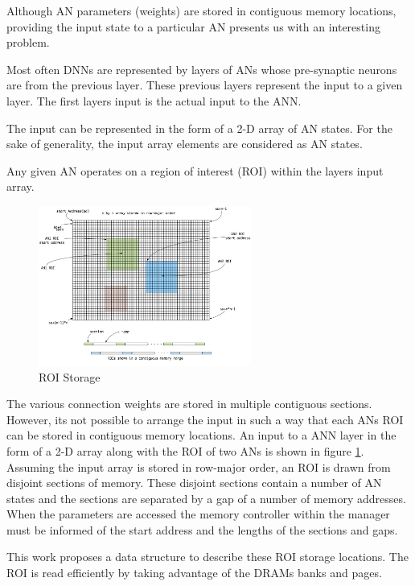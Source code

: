 \documentclass[journal]{IEEEtran}
\begin{document}
Although AN parameters (weights) are stored in contiguous memory locations, providing the input state to a particular AN presents us with an interesting problem.

Most often DNNs are represented by layers of ANs whose pre-synaptic neurons are from the previous layer. These previous layers represent the input to a given layer. The first layers input is the actual input to the ANN.

The input can be represented in the form of a 2-D array of AN states. For the sake of generality, the input array elements are considered as AN states.

Any given AN operates on a region of interest (ROI) within the layers input array.


\begin{figure}[!t]
\centerline{
\mbox{\includegraphics[width=2.75in]{roiStorage.jpg}}
}
\caption{ROI Storage}
\label{fig:roiStorage}
\end{figure}

The various connection weights are stored in multiple contiguous sections. However, its not possible to arrange the input in such a way that each ANs ROI can be stored in contiguous memory locations. 
An input to a ANN layer in the form of a 2-D array along with the ROI of two ANs is shown in figure \ref{fig:roiStorage}. 
Assuming the input array is stored in row-major order, an ROI is drawn from disjoint sections of memory. 
These disjoint sections contain a number of AN states and the sections are separated by a gap of a number of memory addresses. When the parameters are accessed the memory controller within the manager must be informed of the start address and the lengths of the sections and gaps. 

This work proposes a data structure to describe these ROI storage locations.  
The ROI is read efficiently by taking advantage of the DRAMs banks and pages.
\end{document}
